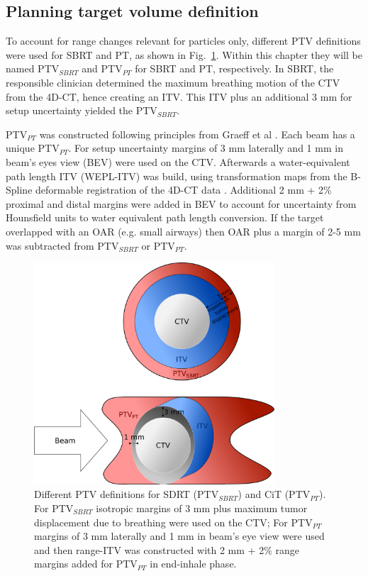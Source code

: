 \subsection{Planning target volume definition}

To account for range changes relevant for particles only, different PTV definitions were used for SBRT and PT, as shown in Fig.~\ref{Fig:PTV_def}. Within this chapter they will be named PTV$_{SBRT}$ and PTV$_{PT}$ for SBRT and PT, respectively.
In SBRT, the responsible clinician determined the maximum breathing motion of the CTV from the 4D-CT, hence creating an ITV. This ITV plus an additional 3 mm for setup uncertainty yielded the PTV$_{SBRT}$.

PTV$_{PT}$ was constructed following principles from Graeff et al \cite{Graeff2012}. Each beam has a unique PTV$_{PT}$. For setup uncertainty margins of 3 mm laterally and 1 mm in beam’s eyes view (BEV) were used on the CTV. Afterwards a water-equivalent path length ITV (WEPL-ITV) was build, using transformation maps from the B-Spline deformable registration of the 4D-CT data \cite{Shackleford2010}. Additional 2 mm + 2\% proximal and distal margins were added in BEV to account for uncertainty from Hounsfield units to water equivalent path length conversion.
If the target overlapped with an OAR (e.g. small airways) then OAR plus a margin of 2-5 mm was subtracted from PTV$_{SBRT}$ or PTV$_{PT}$.


\begin{figure}[H]
\begin{center}
\includegraphics[width=0.8\textwidth]{./PatientStudy/Images/Figure1.png}
\caption{Different PTV definitions for SDRT (PTV$_{SBRT}$) and CiT (PTV$_{PT}$). For PTV$_{SBRT}$ isotropic margins of 3 mm plus maximum tumor displacement due to 
breathing were used on the CTV; For PTV$_{PT}$ margins of 3 mm laterally and 1 mm in beam’s eye view were used and then range-ITV was constructed with
2 mm + 2\% range margins added for PTV$_{PT}$ in end-inhale phase.}
\label{Fig:PTV_def}
\end{center}
\end{figure}

